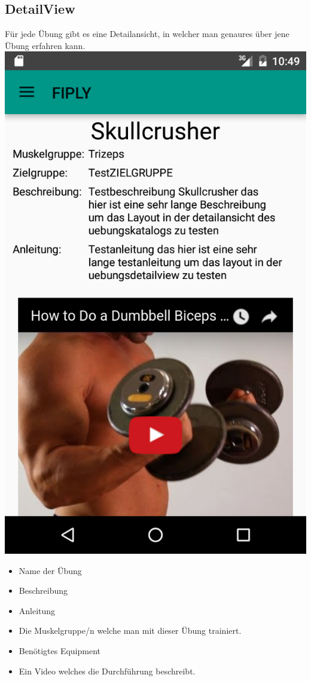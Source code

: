 \documentclass[FIPLY_base.tex]{subfiles}
\begin{document}
\subsection{DetailView}
Für jede Übung gibt es eine Detailansicht, in welcher man genaures über jene Übung erfahren kann.
\includegraphics[scale=0.4]{img/UebungsKatalog_detail_video }

\begin{itemize}
\item Name der Übung
\item Beschreibung
\item Anleitung
\item Die Muskelgruppe/n welche man mit dieser Übung trainiert.
\item Benötigtes Equipment
\item Ein Video welches die Durchführung beschreibt.
\end{itemize}
\end{document}
